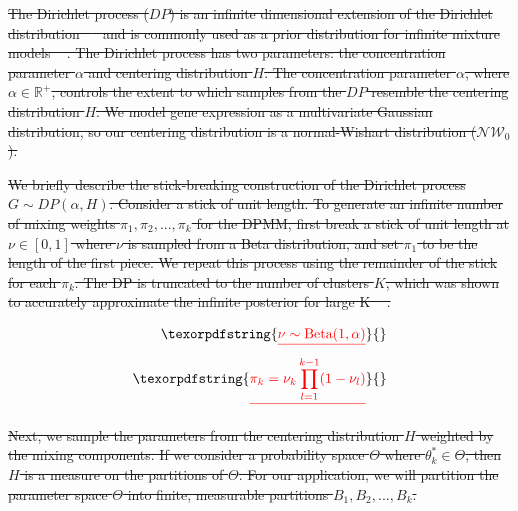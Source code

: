 \documentclass[10pt,letterpaper]{article}
\providecommand{\DIFdeltex}[1]{{\protect\color{red}\sout{#1}}}                      %
\providecommand{\DIFdel}[1]{\texorpdfstring{\DIFdeltex{#1}}{}} %
\begin{document}
\DIFdel{The Dirichlet process ($DP$) is an infinite dimensional extension of the Dirichlet distribution \mbox{%
\cite{fergusonBayesianAnalysisNonparametric1973} }\hspace{0pt}%
and is commonly used as a prior distribution for infinite mixture models \mbox{%
\cite{muller2004nonparametric, gorurDirichletProcessGaussian2010}}\hspace{0pt}%
. The Dirichlet process has two parameters: the concentration parameter $\alpha$ and centering distribution $H$. The concentration parameter $\alpha$, where $\alpha \in \mathbb{R}^+$, controls the extent to which samples from the $DP$ resemble the centering distribution $H$. We model gene expression as a multivariate Gaussian distribution, so our centering distribution is a normal-Wishart distribution ($\mathcal{NW}_0$).
}%

\DIFdel{We briefly describe the stick-breaking construction of the Dirichlet process $G \sim DP(\alpha, H)$. Consider a stick of unit length. To generate an infinite number of mixing weights $\pi_1, \pi_2, ..., \pi_k$ for the DPMM, first break a stick of unit length at $\nu \in [0, 1]$ where $\nu$ is sampled from a Beta distribution, and set $\pi_1$ to be the length of the first piece. We repeat this process using the remainder of the stick for each $\pi_k$. The DP is truncated to the number of clusters $K$, which was shown to accurately approximate the infinite posterior for large K \mbox{%
\cite{hughes2013memoized, teh2010dirichlet, gelmanBayesianDataAnalysis2013, fergusonBayesianAnalysisNonparametric1973, mullerBayesianNonparametricData2015, phadia2015prior}}\hspace{0pt}%
.
}%

\begin{align*}
\DIFdel{%
\nu \sim \text{Beta}(1, \alpha) }\\
\DIFdel{\pi_k = \nu_k \prod_{l=1}^{k-1}(1 - \nu_l)
}\end{align*}

\DIFdel{Next, we sample the parameters from the centering distribution $H$ weighted by the mixing components. If we consider a probability space $\Theta$ where $\theta_k^{*} \in \Theta$, then $H$ is a measure on the partitions of $\Theta$. For our application, we will partition the parameter space $\Theta$ into finite, measurable partitions $B_1, B_2, ..., B_k$.
}%
\end{document}
